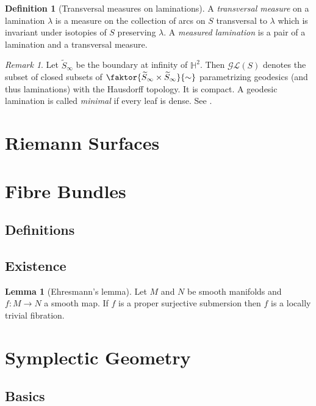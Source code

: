 \documentclass[a4paper]{article}
\newcommand{\HH}{\mathbb{H}}
\newcommand{\mcL}{\mathcal L}
\newcommand{\mcG}{\mathcal G}
\newcommand{\lra}{\longrightarrow}
\newcommand{\wt}[1]{\widetilde{#1}}
\theoremstyle{definition}
\newtheorem{lem}{Lemma}
\theoremstyle{definition}
\newtheorem{definition}{Definition}
\theoremstyle{remark}
\newtheorem{rmk}{Remark}
\theoremstyle{remark}
\theoremstyle{remark}
\begin{document}
\begin{definition}[Transversal measures on laminations]
  A \emph{transversal measure} on a lamination $\lambda$ is a measure on the collection of arcs on $S$ transversal to $\lambda$ which  is invariant under isotopies of $S$ preserving $\lambda$. A \emph{measured lamination} is a pair of a lamination and a transversal measure.
\end{definition}

\begin{rmk}
  Let $\wt{S}_{\infty}$ be the boundary at infinity of $\HH^2$. Then $\mcG\mcL(S)$ denotes the subset of closed subsets of $\faktor{\wt{S}_{\infty}\times \wt{S}_{\infty}}{\sim}$ parametrizing geodesics (and thus laminations) with the Hausdorff topology. It is compact. A geodesic lamination is called \emph{minimal} if every leaf is dense. See \cite{Brock2014}.
\end{rmk}
\section{Riemann Surfaces}

\section{Fibre Bundles}

\subsection{Definitions}

\subsection{Existence}


\begin{lem}[Ehresmann's lemma]
  Let $M$ and $N$ be smooth manifolds and $f:M\lra N$ a smooth map. If $f$ is a proper surjective submersion then $f$ is a locally trivial fibration.
\end{lem}

\section{Symplectic Geometry}

\subsection{Basics}
\end{document}
